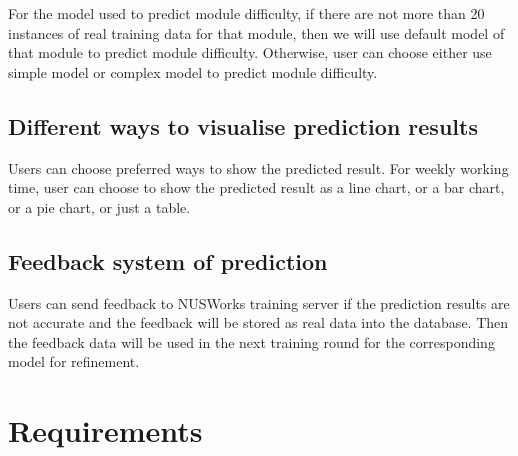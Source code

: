\documentclass[fyp]{socreport}
\begin{document}
For the model used to predict module difficulty, if there are not more than 20 instances of real training data for that module, then we will use default model of that module to predict module difficulty. Otherwise, user can choose either use simple model or complex model to predict module difficulty.

\subsection{Different ways to visualise prediction results}
Users can choose preferred ways to show the predicted result. For weekly working time, user can choose to show the predicted result as a line chart, or a bar chart, or a pie chart, or just a table.

\subsection{Feedback system of prediction}
Users can send feedback to NUSWorks training server if the prediction results are not accurate and the feedback will be stored as real data into the database. Then the feedback data will be used in the next training round for the corresponding model for refinement.

\section{Requirements}
\end{document}
